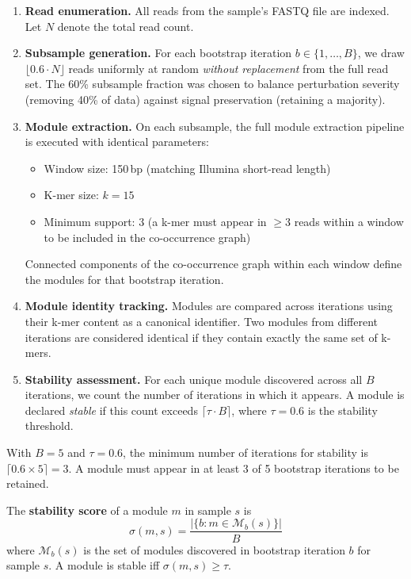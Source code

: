 \documentclass{../yalumba}
\begin{document}
\begin{enumerate}
  \item \textbf{Read enumeration.}  All reads from the sample's FASTQ file are
    indexed.  Let $N$ denote the total read count.
  \item \textbf{Subsample generation.}  For each bootstrap iteration
    $b \in \{1, \ldots, B\}$, we draw $\lfloor 0.6 \cdot N \rfloor$ reads
    uniformly at random \emph{without replacement} from the full read set.
    The 60\% subsample fraction was chosen to balance perturbation severity
    (removing 40\% of data) against signal preservation (retaining a majority).
  \item \textbf{Module extraction.}  On each subsample, the full module
    extraction pipeline is executed with identical parameters:
    \begin{itemize}
      \item Window size: 150\,bp (matching Illumina short-read length)
      \item K-mer size: $k = 15$
      \item Minimum support: 3 (a k-mer must appear in $\geq 3$ reads
        within a window to be included in the co-occurrence graph)
    \end{itemize}
    Connected components of the co-occurrence graph within each window
    define the modules for that bootstrap iteration.
  \item \textbf{Module identity tracking.}  Modules are compared across
    iterations using their k-mer content as a canonical identifier.  Two
    modules from different iterations are considered identical if they contain
    exactly the same set of k-mers.
  \item \textbf{Stability assessment.}  For each unique module discovered
    across all $B$ iterations, we count the number of iterations in which it
    appears.  A module is declared \emph{stable} if this count exceeds
    $\lceil \tau \cdot B \rceil$, where $\tau = 0.6$ is the stability
    threshold.
\end{enumerate}

With $B = 5$ and $\tau = 0.6$, the minimum number of iterations for stability
is $\lceil 0.6 \times 5 \rceil = 3$.  A module must appear in at least 3 of 5
bootstrap iterations to be retained.

\begin{definition}
The \textbf{stability score} of a module $m$ in sample $s$ is
\[
  \sigma(m, s) = \frac{|\{b : m \in \mathcal{M}_b(s)\}|}{B}
\]
where $\mathcal{M}_b(s)$ is the set of modules discovered in bootstrap
iteration $b$ for sample $s$.  A module is stable iff $\sigma(m, s) \geq \tau$.
\end{definition}
\end{document}
